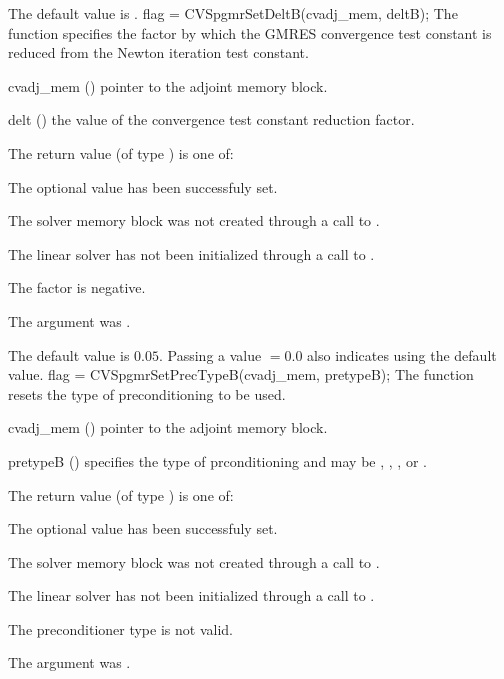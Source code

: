 {
  The default value is .
}
{
  flag = CVSpgmrSetDeltB(cvadj\_mem, deltB);
}
{
  The function  specifies the factor by
  which the GMRES convergence test constant is reduced
  from the Newton iteration test constant.
}
{
  \begin{args}
  \item[cvadj\_mem] ()
    pointer to the adjoint memory block.
  \item[delt] ()
    the value of the convergence test constant reduction factor.
  \end{args}
}
{
  The return value  (of type ) is one of:
  \begin{args}
  \item[\Id{CVSPGMR\_SUCCESS}] 
    The optional value has been successfuly set.
  \item[\Id{CVSPGMR\_MEM\_NULL}]
    The {\cvodes} solver memory block was not created through a call to .
  \item[\Id{CVSPGMR\_LMEM\_NULL}]
    The {\cvspgmr} linear solver has not been initialized through a call to .
  \item[\Id{CVSPGMR\_ILL\_INPUT}]
    The factor  is negative.  
  \item[\Id{CV\_ADJMEM\_NULL}]
    The  argument was .
  \end{args}
}
{
  The default value is $0.05$.
  Passing a value $ = 0.0$ also indicates using the default value.
}
{
  flag = CVSpgmrSetPrecTypeB(cvadj\_mem, pretypeB);
}
{
  The function  resets the type
  of preconditioning to be used.
}
{
  \begin{args}
  \item[cvadj\_mem] ()
    pointer to the adjoint memory block.
  \item[pretypeB] ()
    specifies the type of prconditioning and may be
    , , , or .
  \end{args}
}
{
  The return value  (of type ) is one of:
  \begin{args}
  \item[\Id{CVSPGMR\_SUCCESS}] 
    The optional value has been successfuly set.
  \item[\Id{CVSPGMR\_MEM\_NULL}]
    The {\cvodes} solver memory block was not created through a call to .
  \item[\Id{CVSPGMR\_LMEM\_NULL}]
    The {\cvspgmr} linear solver has not been initialized through a call to .
  \item[\Id{CVSPGMR\_ILL\_INPUT}]
    The preconditioner type  is not valid.
  \item[\Id{CV\_ADJMEM\_NULL}]
    The  argument was .
  \end{args}
}
